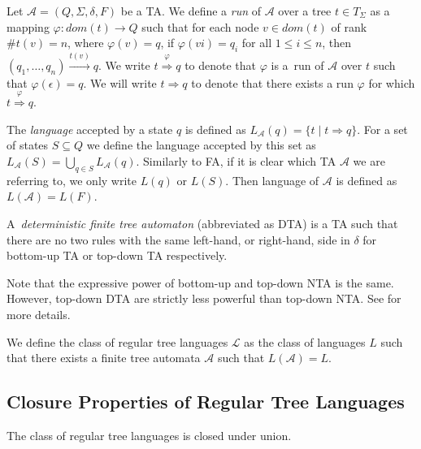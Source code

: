 Let $\mathcal{A} = (Q, \Sigma, \delta, F)$ be a TA. We define a \emph{run} of
$\mathcal{A}$ over a tree $t \in T_\Sigma$ as a mapping $\varphi: dom(t) \to Q$
such that for each node $v \in dom(t)$ of rank $\#t(v) = n$, where $\varphi(v) =
q$, if $\varphi(vi) = q_i$ for all $1 \leq i \leq n$, then $(q_1,\ldots,q_n)
\overset{t(v)}{\longrightarrow} q$. We write $t
\overset{\varphi}{\Longrightarrow} q$ to denote that $\varphi$ is a~run of
$\mathcal{A}$ over $t$ such that $\varphi(\epsilon) = q$. We will write $t
\Longrightarrow q$ to denote that there exists a run $\varphi$ for which $t
\overset{\varphi}{\Longrightarrow} q$.

The \emph{language} accepted by a state $q$ is defined as $L_{\mathcal{A}}(q) =
\{t \mid t \Rightarrow q\}$. For a set of states $S \subseteq Q$ we define the
language accepted by this set as $L_{\mathcal{A}}(S) = \bigcup_{q \in S}
L_{\mathcal{A}}(q)$. Similarly to FA, if it is clear which TA $\mathcal{A}$ we
are referring to, we only write $L(q)$ or $L(S)$. Then language of $\mathcal{A}$
is defined as $L(\mathcal{A}) = L(F)$.

\begin{defz}
A~\emph{deterministic finite tree automaton} (abbreviated as DTA) is a
TA such that there are no two rules with the
same left-hand, or right-hand, side in $\delta$ for bottom-up TA or top-down
TA respectively.
\end{defz}

Note that the expressive power of bottom-up and top-down NTA is the same.
However, top-down DTA are strictly less powerful than top-down NTA. See
\cite{tata} for more details.

\begin{defz}
We define the class of regular tree languages $\mathcal{L}$ as the class of
languages $L$ such that there exists a finite tree automata $\mathcal{A}$ such that
$L(\mathcal{A}) = L$.
\end{defz}



\subsection{Closure Properties of Regular Tree Languages}\label{ta-closures}

\begin{theorem}
 The class of regular tree languages is closed under union.
\end{theorem}

